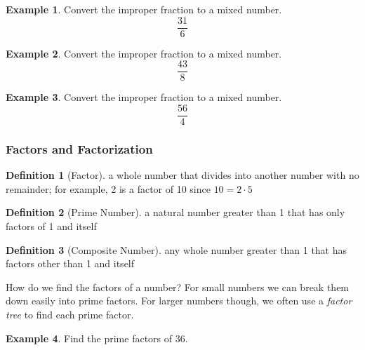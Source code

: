 \documentclass[addpoints,12pt]{exam}
\theoremstyle{definition}
\newtheorem{example}{Example}[subsection]
\newtheorem{definition}{Definition}[subsection]
\begin{document}
\vspace{.5in}

\begin{example}

Convert the improper fraction to a mixed number.
\[ \dfrac{31}{6}\]
\vspace{1in}
\end{example}

\begin{example}

Convert the improper fraction to a mixed number.
\[ \dfrac{43}{8}\]
\vspace{1in}
\end{example}

\begin{example}

Convert the improper fraction to a mixed number.
\[ \dfrac{56}{4}\]
\vspace{1in}
\end{example}


\newpage

\subsubsection*{Factors and Factorization}
\begin{definition}[Factor]
a whole number that divides into another number with no remainder; for example, 2 is a factor of 10 since $ 10 = 2\cdot 5$
\end{definition}
\vspace{.1in}
\begin{definition}[Prime Number]
a natural number greater than 1 that has only factors of 1 and itself
\end{definition}
\vspace{.1in}
\begin{definition}[Composite Number]
any whole number greater than 1 that has factors other than 1 and itself
\end{definition}
\vspace{.25in}

\noindent How do we find the factors of a number? For small numbers we can break them down easily into prime factors. For larger numbers though, we often use a \emph{factor tree} to find each prime factor.

\vspace{.25in}

\begin{example}
Find the prime factors of 36.
\vspace{3in}
\end{example}
\newpage
\end{document}
